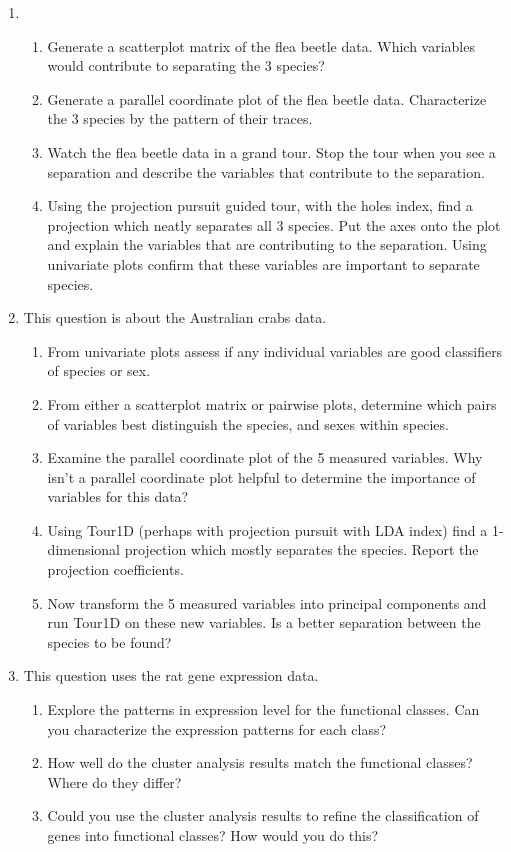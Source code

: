 \documentclass{article}
\begin{document}
\begin{enumerate}
\item
\begin{enumerate} This question uses the flea beetle data. 
\item
Generate a scatterplot matrix of the flea beetle data. Which variables
would contribute to separating the 3 species?
\item
Generate a parallel coordinate plot of the flea beetle data. Characterize 
the 3 species by the pattern of their traces.
\item
Watch the flea beetle data in a grand tour. Stop the tour when you see a 
separation and describe the variables that contribute to the separation.
\item
Using the projection pursuit guided tour, with the holes index, find a
projection which neatly separates all 3 species. Put the axes onto the
plot and explain the variables that are contributing to the
separation. Using univariate plots confirm that these variables are
important to separate species. 
\end{enumerate}
\item This question is about the Australian crabs data.
\begin{enumerate}
\item
From univariate plots assess if any individual variables are good
classifiers of species or sex.
\item From either a scatterplot matrix or pairwise plots, determine 
which pairs of variables best distinguish the species, and sexes
within species.
\item Examine the parallel coordinate plot of the 5 measured variables. 
Why isn't a parallel coordinate plot helpful to determine the 
importance of variables for this data?
\item Using Tour1D (perhaps with projection pursuit with LDA index) 
find a 1-dimensional projection which mostly separates the 
species. Report the projection coefficients.
\item Now transform the 5 measured variables into principal components 
and run Tour1D on these new variables. Is a better separation between
the species to be found?
\end{enumerate}
\item This question uses the rat gene expression data.
\begin{enumerate}
\item Explore the patterns in expression level for the functional
classes. Can you characterize the expression patterns for each class?
\item How well do the cluster analysis results match the functional
classes? Where do they differ? 
\item Could you use the cluster analysis results to refine the
classification of genes into functional classes? How would you do
this?
\end{enumerate}
\end{enumerate}
\end{document}

